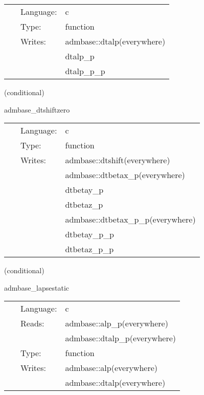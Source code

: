 \documentclass{article}
\begin{document}
 \begin{tabular*}{160mm}{cll} 
~ & Language:  & c \\ 
~ & Type:  & function \\ 
~ & Writes:  & admbase::dtalp(everywhere) \\ 
~& ~ &dtalp\_p\\ 
~& ~ &dtalp\_p\_p\\ 
\end{tabular*} 


\vspace{5mm}

   (conditional) 

\hspace{5mm} admbase\_dtshiftzero 

\hspace{5mm}{\it set the dtshift to 0 at all points } 


\hspace{5mm}

 \begin{tabular*}{160mm}{cll} 
~ & Language:  & c \\ 
~ & Type:  & function \\ 
~ & Writes:  & admbase::dtshift(everywhere) \\ 
~& ~ &admbase::dtbetax\_p(everywhere)\\ 
~& ~ &dtbetay\_p\\ 
~& ~ &dtbetaz\_p\\ 
~& ~ &admbase::dtbetax\_p\_p(everywhere)\\ 
~& ~ &dtbetay\_p\_p\\ 
~& ~ &dtbetaz\_p\_p\\ 
\end{tabular*} 


\vspace{5mm}

   (conditional) 

\hspace{5mm} admbase\_lapsestatic 

\hspace{5mm}{\it copy the lapse to the current time level } 


\hspace{5mm}

 \begin{tabular*}{160mm}{cll} 
~ & Language:  & c \\ 
~ & Reads:  & admbase::alp\_p(everywhere) \\ 
~& ~ &admbase::dtalp\_p(everywhere)\\ 
~ & Type:  & function \\ 
~ & Writes:  & admbase::alp(everywhere) \\ 
~& ~ &admbase::dtalp(everywhere)\\ 
\end{tabular*} 
\end{document}

